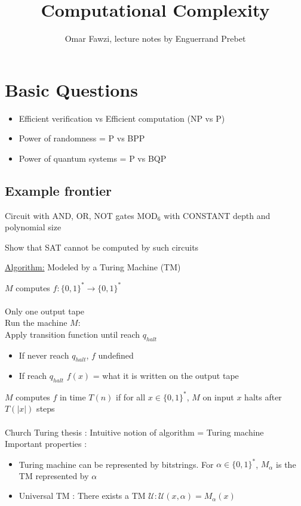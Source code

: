 \documentclass{article}
\theoremstyle{definition}
\theoremstyle{remark}
\begin{document}
	
\title{Computational Complexity}
\author{Omar Fawzi, lecture notes by Enguerrand Prebet}

\maketitle
\tableofcontents

\section{Basic Questions}
\begin{itemize}
	\item Efficient verification vs Efficient computation (NP vs P)
	\item Power of randomness = P vs BPP
	\item Power of quantum systems = P vs BQP 
\end{itemize}

\subsection{Example frontier}
Circuit with AND, OR, NOT gates 
	MOD$_6$
	with CONSTANT depth and polynomial size
	
Show that SAT cannot be computed by such circuits

\underline{Algorithm:} Modeled by a Turing Machine (TM)

$M$ computes $f:\{0,1\}^* \rightarrow \{0,1\}^*$\\\\
Only one output tape\\
Run the machine $M$:\\
Apply transition function until reach $q_{halt}$

\begin{itemize}
	\item If never reach $q_{halt}$, $f$ undefined
	\item If reach $q_{halt}$ $f(x)$ = what it is written on the output tape
\end{itemize}
$M$ computes $f$ in time $T(n)$ if for all $x \in \{0,1\}^*$, $M$ on input $x$ halts after $T(|x|)$ steps\\\\
Church Turing thesis : Intuitive notion of algorithm = Turing machine\\

Important properties :
\begin{itemize}
	\item Turing machine can be represented by bitstrings. For $\alpha \in \{0,1\}^*$, $M_\alpha$ is the TM represented by $\alpha$
	\item Universal TM : There exists a TM $\mathcal{U} : \mathcal{U}(x,\alpha) = M_\alpha(x)$
\end{itemize}
\end{document}
